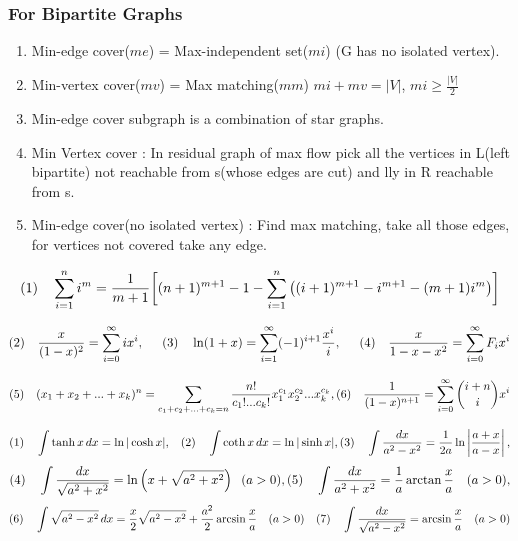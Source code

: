 \documentclass[12pt]{extarticle}
\begin{document}
\begin{multicols*}{2}
		\subsubsection*{For Bipartite Graphs}
		\begin{enumerate}
			\itemsep0em 
			\item Min-edge cover($me$) = Max-independent set($mi$) (G has no isolated vertex).
			\item Min-vertex cover($mv$) = Max matching($mm$) \hspace{5mm} $mi + mv = |V|$,\hspace{5mm} $mi \geq \frac{|V|}{2}$
			\item Min-edge cover subgraph is a combination of star graphs.
			\item Min Vertex cover : In residual graph of max flow pick all the vertices in 
			L(left bipartite) not reachable from s(whose edges are cut) and lly in R reachable from s.
			\item Min-edge cover(no isolated vertex) : Find max matching, take all those edges, for vertices not covered
			take any edge.
		\end{enumerate}
		
			$$(1) \quad \sum_{i=1}^n i^m = {1 \over m+1} \bigg[ (n+1)^{m+1} - 1 - \sum_{i=1}^n \big((i+1)^{m+1} - i^{m+1} - (m+1)i^m\big) \bigg]$$
		
			$$ (2) \quad {x \over (1 - x)^2} = \sum_{i=0}^\infty i x^i, \hspace{5mm}
			(3) \quad \ln (1 + x) = \sum_{i=1}^\infty (-1)^{i+1} {x^i \over i}, \hspace{5mm} (4) \quad {x \over 1 - x - x^2} = \sum_{i=0}^\infty F_i x^i$$
			
			$$ (5) \quad (x_1 + x_2 + ... + x_k)^n = \sum_{c_1 + c_2 + ... + c_k = n}
			\frac{n!}{c_1!...c_k!} x_1^{c_1} x_2^{c_2} ... x_k^{c_k},
			(6) \quad {1 \over (1-x)^{n+1}}
				= \sum_{i=0}^\infty {i+ n \choose i} x^i$$
		
	
	$$(1) \quad \int \tanh x \, dx = \ln \vert \cosh x \vert, \hspace{3mm}
	(2) \quad \int \coth x \, dx = \ln \vert \sinh x \vert,
	(3) \quad \int {dx  \over a^2 - x^2} = {1 \over 2a} \ln\left\vert{a + x \over a - x}\right\vert, $$
	$$ (4) \quad \int {dx  \over \sqrt{a^2 + x^2}}= \ln \left(x + \sqrt{a^2 + x^2}\right) \hspace{0.2cm} (a > 0),(5) \quad \int {dx  \over a^2 + x^2}= \frac 1 a \arctan \frac x a \quad (a > 0), $$
	$$(6) \quad \int \sqrt{a^2 - x^2} \, dx = \frac x 2 \sqrt{a^2 - x^2} + \frac{a^2}{2} \arcsin \frac x a \quad (a > 0) \quad (7) \quad \int {dx  \over \sqrt{a^2 - x^2}} = \arcsin \frac x a \quad (a > 0) $$
	

\end{multicols*}
\end{document}
